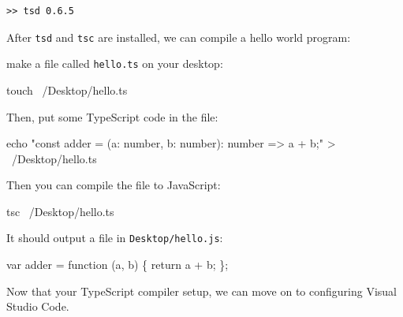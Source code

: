 \documentclass[12pt,]{article}
\newenvironment{Shaded}{}{}
\newcommand{\KeywordTok}[1]{\textcolor[rgb]{0.00,0.00,1.00}{{#1}}}
\newcommand{\StringTok}[1]{\textcolor[rgb]{0.00,0.50,0.50}{{#1}}}
\newcommand{\ControlFlowTok}[1]{\textcolor[rgb]{0.00,0.00,1.00}{{#1}}}
\newcommand{\OperatorTok}[1]{{#1}}
\newcommand{\NormalTok}[1]{{#1}}
\begin{document}
\begin{verbatim}
>> tsd 0.6.5
\end{verbatim}

After \texttt{tsd} and \texttt{tsc} are installed, we can compile a
hello world program:

make a file called \texttt{hello.ts} on your desktop:

\begin{Shaded}
\begin{Highlighting}[numbers=left,,]
\KeywordTok{touch} \NormalTok{~/Desktop/hello.ts}
\end{Highlighting}
\end{Shaded}

Then, put some TypeScript code in the file:

\begin{Shaded}
\begin{Highlighting}[numbers=left,,]
\KeywordTok{echo} \StringTok{"const adder = (a: number, b: number): number => a + b;"} \KeywordTok{>} \NormalTok{~/Desktop/hello.ts}
\end{Highlighting}
\end{Shaded}

Then you can compile the file to JavaScript:

\begin{Shaded}
\begin{Highlighting}[numbers=left,,]
\KeywordTok{tsc} \NormalTok{~/Desktop/hello.ts}
\end{Highlighting}
\end{Shaded}

It should output a file in \texttt{Desktop/hello.js}:

\begin{Shaded}
\begin{Highlighting}[numbers=left,,]
\KeywordTok{var} \NormalTok{adder }\OperatorTok{=} \KeywordTok{function} \NormalTok{(a}\OperatorTok{,} \NormalTok{b) }\OperatorTok{\{} \ControlFlowTok{return} \NormalTok{a }\OperatorTok{+} \NormalTok{b}\OperatorTok{;} \OperatorTok{\};}
\end{Highlighting}
\end{Shaded}

Now that your TypeScript compiler setup, we can move on to configuring
Visual Studio Code.
\end{document}
